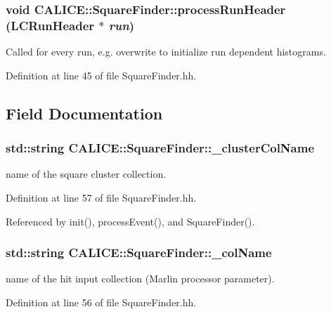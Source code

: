 \subsubsection[{processRunHeader}]{\setlength{\rightskip}{0pt plus 5cm}void CALICE::SquareFinder::processRunHeader (LCRunHeader $\ast$ {\em run})\hspace{0.3cm}{\ttfamily  [inline]}}\label{classCALICE_1_1SquareFinder_a876db4e7ce9e481a7bba79a5c543372f}


Called for every run, e.g. overwrite to initialize run dependent histograms. 

Definition at line 45 of file SquareFinder.hh.

\subsection{Field Documentation}
\subsubsection[{\_\-clusterColName}]{\setlength{\rightskip}{0pt plus 5cm}std::string {\bf CALICE::SquareFinder::\_\-clusterColName}\hspace{0.3cm}{\ttfamily  [protected]}}\label{classCALICE_1_1SquareFinder_ad92613a91542bc47728aa0b37b46ea09}


name of the square cluster collection. 

Definition at line 57 of file SquareFinder.hh.

Referenced by init(), processEvent(), and SquareFinder().
\subsubsection[{\_\-colName}]{\setlength{\rightskip}{0pt plus 5cm}std::string {\bf CALICE::SquareFinder::\_\-colName}\hspace{0.3cm}{\ttfamily  [protected]}}\label{classCALICE_1_1SquareFinder_a8f394987f130f4e495032fd256257ac0}


name of the hit input collection (Marlin processor parameter). 

Definition at line 56 of file SquareFinder.hh.

